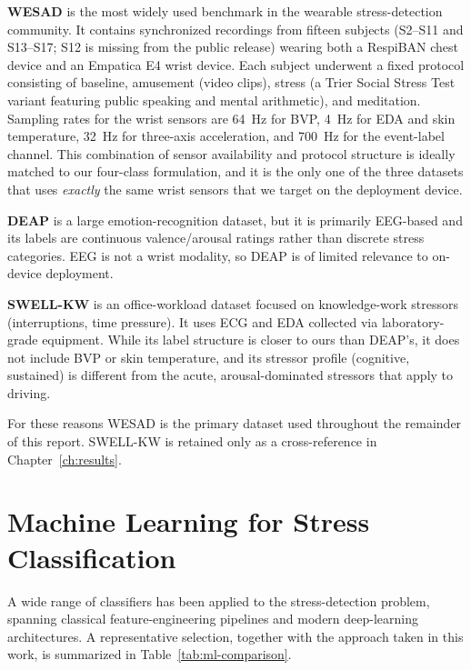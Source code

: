 \textbf{WESAD} \citep{schmidt2018wesad} is the most widely used
benchmark in the wearable stress-detection community. It contains
synchronized recordings from fifteen subjects (S2--S11 and S13--S17;
S12 is missing from the public release) wearing both a RespiBAN
chest device and an Empatica E4 wrist device. Each subject underwent
a fixed protocol consisting of baseline, amusement (video clips),
stress (a Trier Social Stress Test variant featuring public speaking
and mental arithmetic), and meditation. Sampling rates for the wrist
sensors are 64~Hz for BVP, 4~Hz for EDA and skin temperature,
32~Hz for three-axis acceleration, and 700~Hz for the event-label
channel. This combination of sensor availability and protocol
structure is ideally matched to our four-class formulation, and it
is the only one of the three datasets that uses \emph{exactly} the
same wrist sensors that we target on the deployment device.

\textbf{DEAP} is a large emotion-recognition dataset, but it is
primarily EEG-based and its labels are continuous valence/arousal
ratings rather than discrete stress categories. EEG is not a wrist
modality, so DEAP is of limited relevance to on-device deployment.

\textbf{SWELL-KW} \citep{koldijk2014swell} is an office-workload
dataset focused on knowledge-work stressors (interruptions, time
pressure). It uses ECG and EDA collected via laboratory-grade
equipment. While its label structure is closer to ours than DEAP's,
it does not include BVP or skin temperature, and its stressor
profile (cognitive, sustained) is different from the acute,
arousal-dominated stressors that apply to driving.

For these reasons WESAD is the primary dataset used throughout the
remainder of this report. SWELL-KW is retained only as a
cross-reference in Chapter~\ref{ch:results}.

\section{Machine Learning for Stress Classification}
\label{sec:lit-ml}

A wide range of classifiers has been applied to the stress-detection
problem, spanning classical feature-engineering pipelines and modern
deep-learning architectures. A representative selection, together
with the approach taken in this work, is summarized in
Table~\ref{tab:ml-comparison}.

